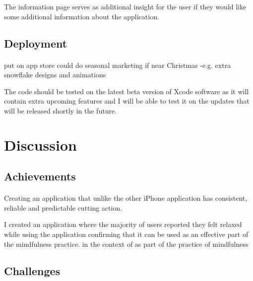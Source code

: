 \documentclass[11pt]{article}
\begin{document}
                The information page serves as additional insight for the user if they would like some additional information about the application. 
                
               



    \subsection{Deployment}
        \paragraph{}
        put on app store
        could do seasonal marketing if near Christmas -e.g. extra snowflake designs and animations
        
        The code should be tested on the latest beta version of Xcode software as it will contain extra upcoming features and I will be able to test it on the updates that will be released shortly in the future. 
        
    
\newpage
\section{Discussion}
    \paragraph{}

    
    \subsection{Achievements}
    
        \paragraph{}
        Creating an application that unlike the other iPhone application has consistent, reliable and predictable cutting action. 
        
        I created an application where the majority of users reported they felt relaxed while using the application confirming that it can be used 
        as an effective part of the mindfulness practice. 
        in the context of as part of the practice of mindfulness 
    
    \subsection{Challenges}
    
\end{document}
